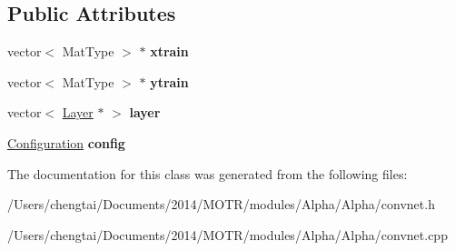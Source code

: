 \subsection*{Public Attributes}
\begin{DoxyCompactItemize}
\item 
\hypertarget{class_conv_net_ace45755a1e3aba68320fbffdeb00a94b}{vector$<$ Mat\+Type $>$ $\ast$ {\bfseries xtrain}}\label{class_conv_net_ace45755a1e3aba68320fbffdeb00a94b}

\item 
\hypertarget{class_conv_net_a7dce29d8568c98fbb2c2f780f19b0b6c}{vector$<$ Mat\+Type $>$ $\ast$ {\bfseries ytrain}}\label{class_conv_net_a7dce29d8568c98fbb2c2f780f19b0b6c}

\item 
\hypertarget{class_conv_net_a3c41d03f1d55e54073da6b7e5039df3b}{vector$<$ \hyperlink{class_layer}{Layer} $\ast$ $>$ {\bfseries layer}}\label{class_conv_net_a3c41d03f1d55e54073da6b7e5039df3b}

\item 
\hypertarget{class_conv_net_a763289b5c332d3920085686aa9216f81}{\hyperlink{struct_configuration}{Configuration} {\bfseries config}}\label{class_conv_net_a763289b5c332d3920085686aa9216f81}

\end{DoxyCompactItemize}


The documentation for this class was generated from the following files\+:\begin{DoxyCompactItemize}
\item 
/\+Users/chengtai/\+Documents/2014/\+M\+O\+T\+R/modules/\+Alpha/\+Alpha/convnet.\+h\item 
/\+Users/chengtai/\+Documents/2014/\+M\+O\+T\+R/modules/\+Alpha/\+Alpha/convnet.\+cpp\end{DoxyCompactItemize}
